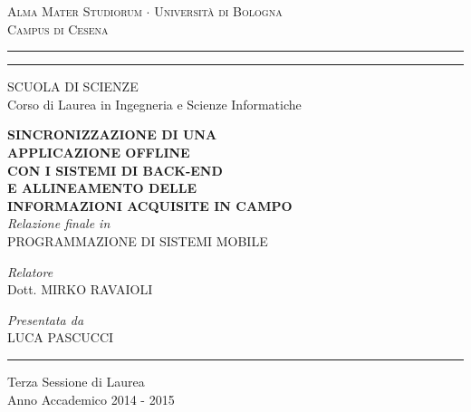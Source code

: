 \documentclass[12pt,a4paper]{report}
\begin{document}
\begin{titlepage}
\begin{center}
{{\Large{\textsc{Alma Mater Studiorum $\cdot$ Universit\`a di Bologna\\Campus di Cesena}}}} 
\rule[0.1cm]{15.8cm}{0.1mm}
\rule[0.5cm]{15.8cm}{0.6mm}
{\small SCUOLA DI SCIENZE\\
Corso di Laurea in Ingegneria e Scienze Informatiche}
\end{center}
\vspace{15mm}
\begin{center}
{\LARGE{\bf SINCRONIZZAZIONE DI UNA}}\\
\vspace{3mm}
{\LARGE{\bf APPLICAZIONE OFFLINE}}\\
\vspace{3mm}
{\LARGE{\bf CON I SISTEMI DI BACK-END}}\\
\vspace{3mm}
{\LARGE{\bf E ALLINEAMENTO DELLE}}\\
\vspace{3mm}
{\LARGE{\bf INFORMAZIONI ACQUISITE IN CAMPO}}\\
\vspace{15mm}
{\it Relazione finale in}\\
PROGRAMMAZIONE DI SISTEMI MOBILE
\end{center}
\vspace{25mm}
\par
\noindent
\begin{minipage}[t]{0.47\textwidth}
{\large {\it Relatore}\\
Dott. MIRKO RAVAIOLI}
\end{minipage}
\hfill
\begin{minipage}[t]{0.47\textwidth}\raggedleft
{\large {\it Presentata da}\\
LUCA PASCUCCI}
\end{minipage}
\vspace{20mm}
\begin{center}
\rule[0.1cm]{15.8cm}{0.1mm}
{\large Terza Sessione di Laurea\\
Anno Accademico 2014 - 2015}
\end{center}
\end{titlepage}
\end{document}
